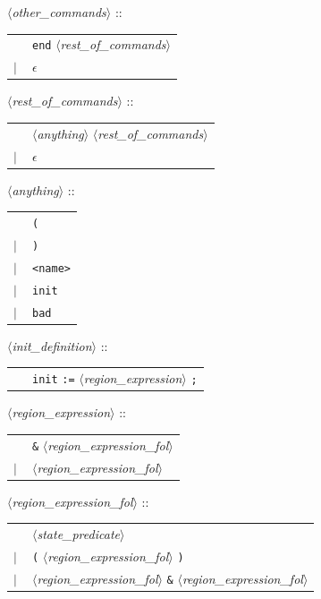 \documentclass[a4paper,11pt]{report}
\newcommand{\emptystring}{$\epsilon$}
\newcommand{\nt}[1]{$\langle$\emph{#1}$\rangle$}
\newcommand{\regleGrammaire}[1]{\bigskip \noindent \nt{#1} :: \\}
\newcommand{\npec}[1]{\textcolor{green!50!black}{#1}}
\newcommand{\styleIMI}[1]{\textcolor{imicolor}{\texttt{#1}}}
\begin{document}
\regleGrammaire{other\_commands}
\begin{tabular}{l l}
	\  & \styleIMI{end} \npec{\nt{rest\_of\_commands}} \\
	$|$ & \emptystring \\
\end{tabular}

\regleGrammaire{\npec{rest\_of\_commands}}
\begin{tabular}{l l}
	\  & \npec{\nt{anything}} \npec{\nt{rest\_of\_commands}} \\
	$|$ & \emptystring \\
\end{tabular}

\regleGrammaire{\npec{anything}}
\begin{tabular}{l l}
	\  & \styleIMI{(} \\
	$|$ & \styleIMI{)} \\
	$|$ & \styleIMI{<name>} \\
	$|$ & \styleIMI{init} \\
	$|$ & \styleIMI{bad} \\
\end{tabular}


\regleGrammaire{init\_definition}
\begin{tabular}{l l}
	\  & \styleIMI{init} \styleIMI{:=} \nt{region\_expression} \styleIMI{;} \\
\end{tabular}

\regleGrammaire{region\_expression}
\begin{tabular}{l l}
	\  & \styleIMI{\&} \nt{region\_expression\_fol}\\
	$|$ & \nt{region\_expression\_fol}\\
\end{tabular}

\regleGrammaire{region\_expression\_fol}
\begin{tabular}{l l}
	\  & \nt{state\_predicate} \\
	$|$ & \styleIMI{(} \nt{region\_expression\_fol} \styleIMI{)} \\
	$|$ & \nt{region\_expression\_fol} \styleIMI{\&} \nt{region\_expression\_fol} \\
\end{tabular}
\end{document}
